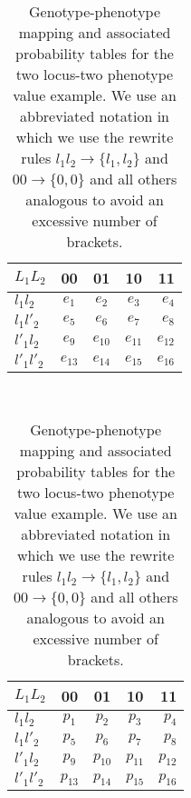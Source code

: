 \begin{table}[!ht]
\centering
\begin{subtable}[t]{0.4\textwidth}
\centering
\begin{tabular}{ l || c | c | c | r }
	$L_1 L_2$  &	00 & 01 & 10 & 11\\ \hline
    $l_1 l_2$ & $e_1$ & $e_2$ & $e_3$ & $e_4$\\ \hline
    $l_1 l'_2$ & $e_5$ & $e_6$ & $e_7$ & $e_8$\\ \hline
    $l'_1 l_2$ & $e_9$ & $e_{10}$ & $e_{11}$ & $e_{12}$\\ \hline
    $l'_1 l'_2$ & $e_{13}$ & $e_{14}$ & $e_{15}$ & $e_{16}$\\
    \hline
    \end{tabular}
    \caption{genotype-phenotype maps}
    \label{tab:gpm}
\end{subtable}
~~~~~~
\begin{subtable}[t]{0.4\textwidth}
\centering
	\begin{tabular}{ l || c | c | c | r }
	$L_1 L_2$  &	00 & 01 & 10 & 11\\ \hline
    $l_1 l_2$ & $p_1$ & $p_2$ & $p_3$ & $p_4$\\ \hline
    $l_1 l'_2$ & $p_5$ & $p_6$ & $p_7$ & $p_8$\\ \hline
    $l'_1 l_2$ & $p_9$ & $p_{10}$ & $p_{11}$ & $p_{12}$\\ \hline
    $l'_1 l'_2$ & $p_{13}$ & $p_{14}$ & $p_{15}$ & $p_{16}$\\
    \hline
	\end{tabular}
	\caption{probabilities}
    \label{tab:probabilities}
\end{subtable}
\caption{Genotype-phenotype mapping and associated probability tables for the two locus-two phenotype value example. We use an abbreviated notation in which we use the rewrite rules $l_1 l_2 \rightarrow \{l_1, l_2\}$ and $00 \rightarrow \{0, 0\}$ and all others analogous to avoid an excessive number of brackets.}
\label{tab:example}
\end{table}
